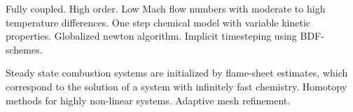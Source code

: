 Fully coupled.
High order.
Low Mach flow numbers with moderate to high temperature differences. 
One step chemical model with variable kinetic properties.
Globalized newton algorithm.
Implicit timesteping using BDF-schemes. 


Steady state combustion systems are initialized by flame-sheet estimates, which correspond to the solution of a system with infinitely fast chemistry. 
Homotopy methods for highly non-linear systems.
Adaptive mesh refinement.


